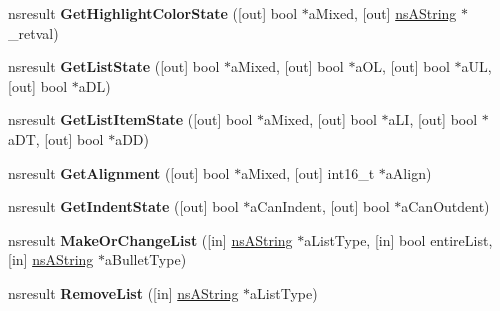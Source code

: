 \begin{DoxyCompactItemize}
nsresult {\bfseries Get\+Highlight\+Color\+State} (\mbox{[}out\mbox{]} bool $\ast$a\+Mixed, \mbox{[}out\mbox{]} \hyperlink{structns_string_container}{ns\+A\+String} $\ast$\+\_\+retval)
\item 
\mbox{\label{interfacens_i_h_t_m_l_editor_a3c7e110c5342a6f8c5fdf7c0a78578d1}} 
nsresult {\bfseries Get\+List\+State} (\mbox{[}out\mbox{]} bool $\ast$a\+Mixed, \mbox{[}out\mbox{]} bool $\ast$a\+OL, \mbox{[}out\mbox{]} bool $\ast$a\+UL, \mbox{[}out\mbox{]} bool $\ast$a\+DL)
\item 
\mbox{\label{interfacens_i_h_t_m_l_editor_adbd3c49b5f82f613c4a7f616ac96357c}} 
nsresult {\bfseries Get\+List\+Item\+State} (\mbox{[}out\mbox{]} bool $\ast$a\+Mixed, \mbox{[}out\mbox{]} bool $\ast$a\+LI, \mbox{[}out\mbox{]} bool $\ast$a\+DT, \mbox{[}out\mbox{]} bool $\ast$a\+DD)
\item 
\mbox{\label{interfacens_i_h_t_m_l_editor_aca257f2750a59a7dd0655b45a2adc969}} 
nsresult {\bfseries Get\+Alignment} (\mbox{[}out\mbox{]} bool $\ast$a\+Mixed, \mbox{[}out\mbox{]} int16\+\_\+t $\ast$a\+Align)
\item 
\mbox{\label{interfacens_i_h_t_m_l_editor_aa395d51d53599b410da73cd0c42725b3}} 
nsresult {\bfseries Get\+Indent\+State} (\mbox{[}out\mbox{]} bool $\ast$a\+Can\+Indent, \mbox{[}out\mbox{]} bool $\ast$a\+Can\+Outdent)
\item 
\mbox{\label{interfacens_i_h_t_m_l_editor_a52a4e4b0f2f42a1e287054dfa5acb11b}} 
nsresult {\bfseries Make\+Or\+Change\+List} (\mbox{[}in\mbox{]} \hyperlink{structns_string_container}{ns\+A\+String} $\ast$a\+List\+Type, \mbox{[}in\mbox{]} bool entire\+List, \mbox{[}in\mbox{]} \hyperlink{structns_string_container}{ns\+A\+String} $\ast$a\+Bullet\+Type)
\item 
\mbox{\label{interfacens_i_h_t_m_l_editor_a00c75909b87c06926546ac20dc33db65}} 
nsresult {\bfseries Remove\+List} (\mbox{[}in\mbox{]} \hyperlink{structns_string_container}{ns\+A\+String} $\ast$a\+List\+Type)
\item 
\mbox{\label{interfacens_i_h_t_m_l_editor_adbaea11999e763420d8ec2ba3dc463e8}} 

\end{DoxyCompactItemize}
